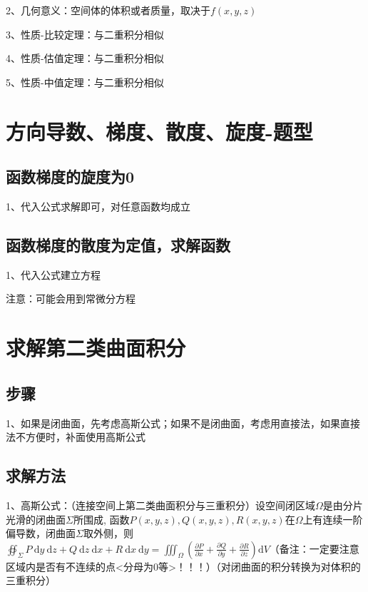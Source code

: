 2、几何意义：空间体的体积或者质量，取决于$f(x, y,z) $

3、性质-比较定理：与二重积分相似

4、性质-估值定理：与二重积分相似

5、性质-中值定理：与二重积分相似

\section{方向导数、梯度、散度、旋度-题型}



\subsection{函数梯度的旋度为0}

1、代入公式求解即可，对任意函数均成立



\subsection{函数梯度的散度为定值，求解函数}

1、代入公式建立方程

注意：可能会用到常微分方程



\section{求解第二类曲面积分}



\subsection{步骤}

1、如果是闭曲面，先考虑高斯公式；如果不是闭曲面，考虑用直接法，如果直接法不方便时，补面使用高斯公式



\subsection{求解方法}

1、高斯公式：（连接空间上第二类曲面积分与三重积分）设空间闭区域$\Omega$是由分片光滑的闭曲面$\Sigma$所围成, 函数$P(x, y, z), Q(x, y, z), R(x, y, z)$在$\Omega$上有连续一阶偏导数，闭曲面$\Sigma$取外侧，则$\oiint_{\Sigma} P \mathrm{~d} y \mathrm{~d} z+Q \mathrm{~d} z \mathrm{~d} x+R \mathrm{~d} x \mathrm{~d} y=\iiint_{\Omega}\left(\frac{\partial P}{\partial x}+\frac{\partial Q}{\partial y}+\frac{\partial R}{\partial z}\right) \mathrm{d} V$（备注：一定要注意区域内是否有不连续的点<分母为0等>！！！）（对闭曲面的积分转换为对体积的三重积分）

